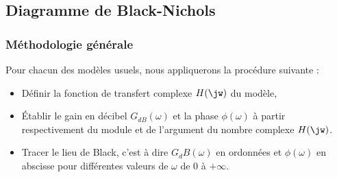 \subsection{Diagramme de Black-Nichols}
\subsubsection{Méthodologie générale}
Pour chacun des modèles usuels, nous appliquerons la procédure suivante :
\begin{itemize}
    \item Définir la fonction de transfert complexe $H(\jw)$ du modèle,
    \item \'Etablir le gain en décibel $G_{dB}(\omega)$ et 
          la phase $\phi(\omega)$ à partir 
          respectivement du module et de l'argument du nombre complexe $H(\jw)$.
    \item Tracer le lieu de Black, c'est à dire $G_dB(\omega)$ en ordonnées 
          et $\phi(\omega)$ en abscisse pour différentes valeurs de $\omega$ 
          de 0 à $+\infty$. 
\end{itemize}
